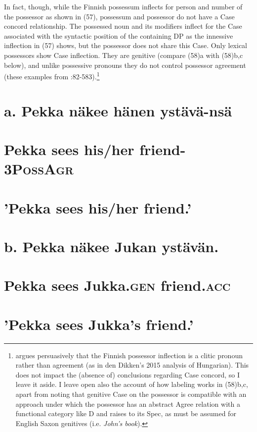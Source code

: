 \documentclass[output=paper
,modfonts
,nonflat]{langsci/langscibook}
\begin{document}
In fact, though, while the Finnish possessum inflects for person and number of the possessor as shown in (57), possessum and possessor do not have a Case concord relationship. The possessed noun and its modifiers inflect for the Case associated with the syntactic position of the containing DP as the innessive inflection in (57) shows, but the possessor does not share this Case. Only lexical possessors show Case inflection. They are genitive (compare (58)a with (58)b,c below), and unlike possessive pronouns they do not control possessor agreement (these examples from \citealt{Toivonen2000}:82-583).\footnote{\citet{Toivonen2000} argues persuasively that the Finnish possessor inflection is a clitic pronoun rather than agreement (as in den Dikken's 2015 analysis of Hungarian). This does not impact the (absence of) conclusions regarding Case concord, so I leave it aside. I leave open also the account of how labeling works in (58)b,c, apart from noting that genitive Case on the possessor is compatible with an approach under which the possessor has an abstract Agree relation with a functional category like D and raises to its Spec, as must be assumed for English Saxon genitives (i.e. \textit{John's book}).}    

\section{a.  Pekka n\"{a}kee  hänen     yst\"{a}v\"{a}-ns\"{a}} 
\label{bkm:Ref486589459}\section{      Pekka sees    his/her   friend-3P\textsc{oss}A\textsc{gr}}
\section{      'Pekka sees his/her friend.'}
\section{}
\section{  b.   Pekka n\"{a}kee   Jukan        yst\"{a}v\"{a}n.} 
\section{      Pekka sees       Jukka.\textsc{gen}   friend.\textsc{acc}} 
\section{      'Pekka sees Jukka’s friend.'} 
\end{document}
